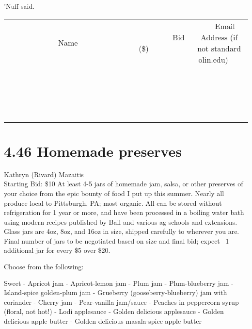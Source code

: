 \documentclass[11pt]{article}
\begin{document}
'Nuff said.
\\[3ex]
\begin{tabular}{c c c}
~~~~~~~~~~~~~Name~~~~~~~~~~~~~ & ~~~~~~~~~Bid (\$)~~~~~~~~~  & ~~~Email Address (if not standard olin.edu)~~~\\
 & & \\
\hline
 & & \\
\hline
 & & \\
\hline
 & & \\
\hline
 & & \\
\hline
 & & \\
\hline
 & & \\
\hline
 & & \\
\hline
 & & \\
\hline
 & & \\
\hline
 & & \\
\hline
 & & \\
\hline
 & & \\
\hline
 & & \\
\hline
 & & \\
\hline
 & & \\
\hline
 & & \\
\hline
 & & \\
\hline
 & & \\
\hline
\end{tabular}
\newpage
\section*{4.46 Homemade preserves}
Kathryn (Rivard) Mazaitis
\\
Starting Bid: \$10
\newline
At least 4-5 jars of homemade jam, salsa, or other preserves of your choice from the epic bounty of food I put up this summer. Nearly all produce local to Pittsburgh, PA; most organic. All can be stored without refrigeration for 1 year or more, and have been processed in a boiling water bath using modern recipes published by Ball and various ag schools and extensions. Glass jars are 4oz, 8oz, and 16oz in size, shipped carefully to wherever you are. Final number of jars to be negotiated based on size and final bid; expect ~1 additional jar for every \$5 over \$20.

Choose from the following:

Sweet
- Apricot jam
- Apricot-lemon jam
- Plum jam
- Plum-blueberry jam
- Island-spice golden-plum jam
- Grueberry (gooseberry-blueberry) jam with coriander
- Cherry jam
- Pear-vanilla jam/sauce
- Peaches in peppercorn syrup (floral, not hot!)
- Lodi applesauce
- Golden delicious applesauce
- Golden delicious apple butter
- Golden delicious masala-spice apple butter
\end{document}
